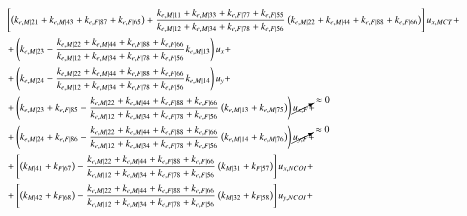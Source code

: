 \documentclass[review]{elsarticle}
\begin{document}
\begin{equation}\label{eq:syseqs03}
\scriptsize
\begin{split}
&\left[\left(k_{e,M|21}+k_{e,M|43}+k_{e,F|87}+k_{e,F|65}\right)+\frac{k_{e,M|11}+k_{e,M|33}+k_{e,F|77}+k_{e,F|55}}{k_{e,M|12}+k_{e,M|34}+k_{e,F|78}+k_{e,F|56}}\left(k_{e,M|22}+k_{e,M|44}+k_{e,F|88}+k_{e,F|66}\right)\right]u_{x,MCT}+\\
&+\left(k_{e,M|23}-\frac{k_{e,M|22}+k_{e,M|44}+k_{e,F|88}+k_{e,F|66}}{k_{e,M|12}+k_{e,M|34}+k_{e,F|78}+k_{e,F|56}}k_{e,M|13}\right)u_{x}+\\
&+\left(k_{e,M|24}-\frac{k_{e,M|22}+k_{e,M|44}+k_{e,F|88}+k_{e,F|66}}{k_{e,M|12}+k_{e,M|34}+k_{e,F|78}+k_{e,F|56}}k_{e,M|14}\right)u_{y}+\\
&+\left(k_{e,M|23}+k_{e,F|85}-\frac{k_{e,M|22}+k_{e,M|44}+k_{e,F|88}+k_{e,F|66}}{k_{e,M|12}+k_{e,M|34}+k_{e,F|78}+k_{e,F|56}}\left(k_{e,M|13}+k_{e,M|75}\right)\right)\cancelto{\approx 0}{u_{x,F}}+\\
&+\left(k_{e,M|24}+k_{e,F|86}-\frac{k_{e,M|22}+k_{e,M|44}+k_{e,F|88}+k_{e,F|66}}{k_{e,M|12}+k_{e,M|34}+k_{e,F|78}+k_{e,F|56}}\left(k_{e,M|14}+k_{e,M|76}\right)\right)\cancelto{\approx 0}{u_{y,F}}+\\
&+\left[\left(k_{M|41}+k_{F|67}\right)-\frac{k_{e,M|22}+k_{e,M|44}+k_{e,F|88}+k_{e,F|66}}{k_{e,M|12}+k_{e,M|34}+k_{e,F|78}+k_{e,F|56}}\left(k_{M|31}+k_{F|57}\right)\right]u_{x,NCOI}+\\
&+\left[\left(k_{M|42}+k_{F|68}\right)-\frac{k_{e,M|22}+k_{e,M|44}+k_{e,F|88}+k_{e,F|66}}{k_{e,M|12}+k_{e,M|34}+k_{e,F|78}+k_{e,F|56}}\left(k_{M|32}+k_{F|58}\right)\right]u_{y,NCOI}+\\

\end{split}
\end{equation}
\end{document}
